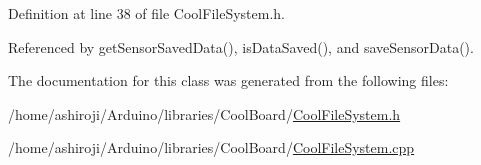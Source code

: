 Definition at line 38 of file Cool\+File\+System.\+h.



Referenced by get\+Sensor\+Saved\+Data(), is\+Data\+Saved(), and save\+Sensor\+Data().



The documentation for this class was generated from the following files\+:\begin{DoxyCompactItemize}
\item 
/home/ashiroji/\+Arduino/libraries/\+Cool\+Board/\hyperlink{CoolFileSystem_8h}{Cool\+File\+System.\+h}\item 
/home/ashiroji/\+Arduino/libraries/\+Cool\+Board/\hyperlink{CoolFileSystem_8cpp}{Cool\+File\+System.\+cpp}\end{DoxyCompactItemize}
